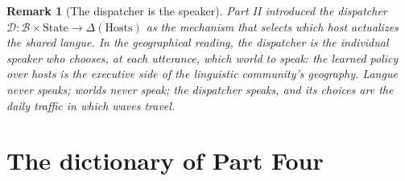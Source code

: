 \documentclass[11pt,a4paper]{article}
\newtheorem{remark}[principle]{Remark}
\theoremstyle{remark}
\newcommand{\Lat}{\ensuremath{\mathcal{B}}}              %
\newcommand{\Disp}{\ensuremath{\mathcal{D}}}             %
\begin{document}
\begin{remark}[The dispatcher is the speaker]
Part II \cite{part2} introduced the dispatcher
$\Disp : \Lat \times \mathrm{State} \to \Delta(\mathrm{Hosts})$ as the
mechanism that selects which host actualizes the shared langue. In the
geographical reading, the dispatcher is the individual speaker who chooses,
at each utterance, which world to speak: the learned policy over hosts is the
executive side of the linguistic community's geography. Langue never speaks;
worlds never speak; the dispatcher speaks, and its choices are the daily
traffic in which waves travel.
\end{remark}

\section{The dictionary of Part Four}
\label{sec:dictionary}
\end{document}
